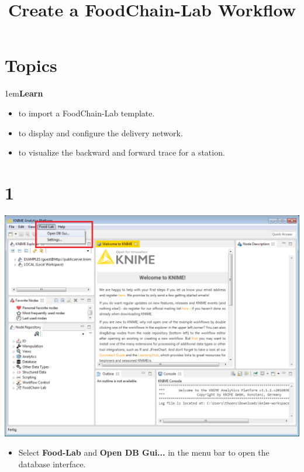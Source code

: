 \documentclass[10pt]{beamer}
\title{Create a FoodChain-Lab Workflow}
\date{}
\begin{document}
\maketitle

\section{Topics}
\begin{frame}
\leftskip1em\textbf{Learn}
	\begin{itemize}
      \item to import a FoodChain-Lab template.
      \item to display and configure the delivery network.
      \item to visualize the backward and forward trace for a station.
    \end{itemize}
\end{frame}

\section{1}
\begin{frame}
	\begin{center}
  		\includegraphics[height=0.6\textheight]{1.png}
	\end{center}
	\begin{itemize}
		\item Select \textbf{Food-Lab} and \textbf{Open DB Gui...} in the menu bar to open the database interface.
	\end{itemize}
\end{frame}
\end{document}
